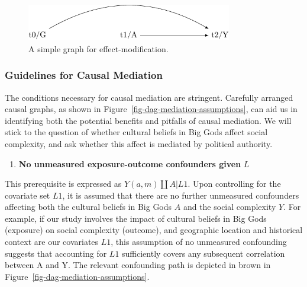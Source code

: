 \documentclass[
  singlecolumn]{report}
\providecommand{\tightlist}{%
  \setlength{\itemsep}{0pt}\setlength{\parskip}{0pt}}\usepackage{longtable,booktabs,array}
\begin{document}
\begin{figure}

{\centering \includegraphics[width=0.8\textwidth,height=\textheight]{causal-dags_files/figure-pdf/fig-dag-effect-modfication-1.pdf}

}

\caption{\label{fig-dag-effect-modfication}A simple graph for
effect-modification.}

\end{figure}

\hypertarget{guidelines-for-causal-mediation}{%
\subsubsection{\texorpdfstring{\textbf{Guidelines for Causal
Mediation}}{Guidelines for Causal Mediation}}\label{guidelines-for-causal-mediation}}

The conditions necessary for causal mediation are stringent. Carefully
arranged causal graphs, as shown in
Figure~\ref{fig-dag-mediation-assumptions}, can aid us in identifying
both the potential benefits and pitfalls of causal mediation. We will
stick to the question of whether cultural beliefs in Big Gods affect
social complexity, and ask whether this affect is mediated by political
authority.

\begin{enumerate}
\def\labelenumi{\arabic{enumi}.}
\tightlist
\item
  \textbf{No unmeasured exposure-outcome confounders given} \(L\)
\end{enumerate}

This prerequisite is expressed as \(Y(a,m) \coprod A | L1\). Upon
controlling for the covariate set \(L1\), it is assumed that there are
no further unmeasured confounders affecting both the cultural beliefs in
Big Gods \(A\) and the social complexity \(Y\). For example, if our
study involves the impact of cultural beliefs in Big Gods (exposure) on
social complexity (outcome), and geographic location and historical
context are our covariates \(L1\), this assumption of no unmeasured
confounding suggests that accounting for \(L1\) sufficiently covers any
subsequent correlation between A and Y. The relevant confounding path is
depicted in brown in Figure~\ref{fig-dag-mediation-assumptions}.
\end{document}
